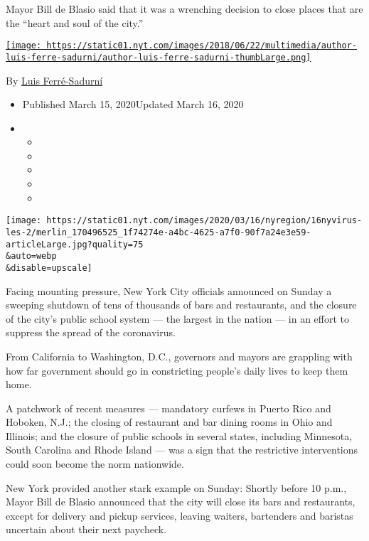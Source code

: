 Mayor Bill de Blasio said that it was a wrenching decision to close
places that are the ``heart and soul of the city.''

\href{https://www.nytimes.com/by/luis-ferre-sadurni}{\texttt{[image: https://static01.nyt.com/images/2018/06/22/multimedia/author-luis-ferre-sadurni/author-luis-ferre-sadurni-thumbLarge.png]}}

By \href{https://www.nytimes.com/by/luis-ferre-sadurni}{Luis
Ferré-Sadurní}

\begin{itemize}
\item
  Published March 15, 2020Updated March 16, 2020
\item
  \begin{itemize}
  \item
  \item
  \item
  \item
  \item
  \end{itemize}
\end{itemize}

\texttt{[image: https://static01.nyt.com/images/2020/03/16/nyregion/16nyvirus-les-2/merlin\_170496525\_1f74274e-a4bc-4625-a7f0-90f7a24e3e59-articleLarge.jpg?quality=75\\\&auto=webp\\\&disable=upscale]}

Facing mounting pressure, New York City officials announced on Sunday a
sweeping shutdown of tens of thousands of bars and restaurants, and the
closure of the city's public school system --- the largest in the nation
--- in an effort to suppress the spread of the coronavirus.

From California to Washington, D.C., governors and mayors are grappling
with how far government should go in constricting people's daily lives
to keep them home.

A patchwork of recent measures --- mandatory curfews in Puerto Rico and
Hoboken, N.J.; the closing of restaurant and bar dining rooms in Ohio
and Illinois; and the closure of public schools in several states,
including Minnesota, South Carolina and Rhode Island --- was a sign that
the restrictive interventions could soon become the norm nationwide.

New York provided another stark example on Sunday: Shortly before 10
p.m., Mayor Bill de Blasio announced that the city will close its bars
and restaurants, except for delivery and pickup services, leaving
waiters, bartenders and baristas uncertain about their next paycheck.

